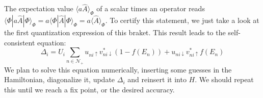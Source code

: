 \documentclass[../main.tex]{subfile}
\begin{document}
The expectation value $\langle a\hat{A}\rangle_{\Phi}$ of a scalar times an operator reads $\langle \Phi|a \hat{A}|\Phi\rangle_{\Phi} = a \langle \Phi|\hat{A}|\Phi\rangle_{\Phi} = a \langle \hat{A}\rangle_{\Phi}$. 
To certify this statement, we just take a look at the first quantization expression of this braket. This result leads to the self-consistent equation:
\begin{equation}\label{eq:SelfConsitentDelta}
    \Delta_i = U_i\sum_{n\in\mathcal{N}_+} u_{ni\uparrow} v_{ni\downarrow}^{\ast} \left(1-f(E_n)\right) + u_{ni\downarrow} v_{ni\uparrow}^{\ast}f(E_n)
\end{equation}
We plan to solve this equation numerically, inserting some guesses in the Hamiltonian, diagonalize it, update $\Delta_i$ and reinsert it into $H$. We should repeat this 
until we reach a fix point, or the desired accuracy.\\
\end{document}
